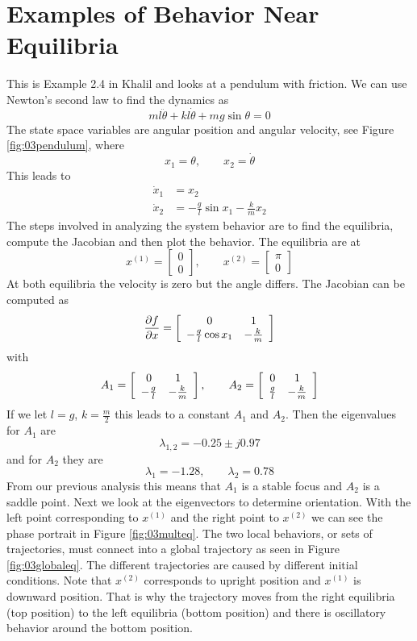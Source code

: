 \section{Examples of Behavior Near Equilibria}
\begin{example}
This is Example 2.4 in Khalil and looks at a pendulum with friction. We can use Newton's second law to find the dynamics as
$$ml\ddot{\theta} + kl\dot{\theta} + mg\sin\theta = 0$$
The state space variables are angular position and angular velocity, see Figure \ref{fig:03pendulum}, where
$$ x_1 = \theta, \qquad x_2 = \dot{\theta}$$
This leads to
\begin{align*}
\dot{x}_1 &= x_2 \\
\dot{x}_2 &= -\tfrac{g}{l}\sin x_1 - \tfrac{k}{m}x_2
\end{align*}
The steps involved in analyzing the system behavior are to find the equilibria, compute the Jacobian and then plot the behavior. The equilibria are at
$$x^{(1)} = \left[\begin{array}{c} 0 \\ 0 \end{array}\right], \qquad x^{(2)} = \left[\begin{array}{c} \pi \\ 0 \end{array}\right]$$
At both equilibria the velocity is zero but the angle differs. The Jacobian can be computed as
$$\frac{\partial f}{\partial x} = \left[\begin{array}{c c} 0 & 1 \\ -\tfrac{g}{l}\cos x_1 & -\tfrac{k}{m} \end{array}\right]$$
with
$$A_1 = \left[\begin{array}{c c} 0 & 1 \\ -\tfrac{g}{l} & -\tfrac{k}{m} \end{array}\right], \qquad A_2 = \left[\begin{array}{c c} 0 & 1 \\ \tfrac{g}{l} & -\tfrac{k}{m} \end{array}\right]$$
If we let $l=g$, $k=\tfrac{m}{2}$ this leads to a constant $A_1$ and $A_2$. Then the eigenvalues for $A_1$ are
$$\lambda_{1,2} = -0.25\pm j0.97$$
and for $A_2$ they are
$$\lambda_1 = -1.28, \qquad \lambda_2 = 0.78$$
From our previous analysis this means that $A_1$ is a stable focus and $A_2$ is a saddle point. Next we look at the eigenvectors to determine orientation. With the left point corresponding to $x^{(1)}$ and the right point to $x^{(2)}$ we can see the phase portrait in Figure \ref{fig:03multeq}. The two local behaviors, or sets of trajectories, must connect into a global trajectory as seen in Figure \ref{fig:03globaleq}. The different trajectories are caused by different initial conditions. Note that $x^{(2)}$ corresponds to upright position and $x^{(1)}$ is downward position. That is why the trajectory moves from the right equilibria (top position) to the left equilibria (bottom position) and there is oscillatory behavior around the bottom position.


\end{example}
